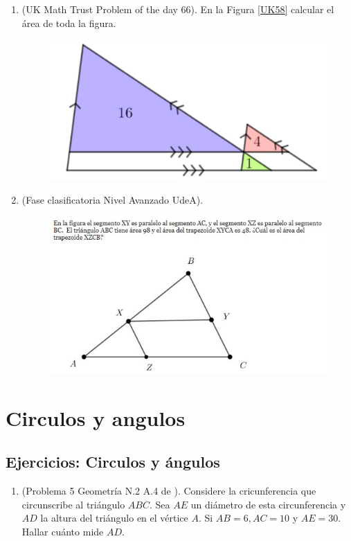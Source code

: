 \begin{enumerate}
	\item (UK Math Trust Problem of the day 66). En la Figura \ref{UK58} calcular el área de toda la figura.
	
	\begin{figure}[H]
		\centering
		\includegraphics[width=0.5\linewidth]{Geometria/imgs/UKMathTrust_PrblemOfTheDay_66}
		\label{UK66}
	\end{figure}

\item (Fase clasificatoria Nivel Avanzado UdeA). 
		\begin{figure}[H]
			\centering
			\includegraphics[width=0.95\linewidth]{Geometria/imgs/udeaproblemasemejanza1}
		\end{figure}
\end{enumerate}
\newpage


\chapter{Circulos y angulos}
\newpage


\begin{center}
	\vspace{-1cm}
	\section{ Ejercicios: Circulos y ángulos}
\end{center}

\begin{enumerate}	
	\item (Problema 5  Geometría N.2 A.4 de \cite{POTI}). Considere la cricunferencia que circunscribe al triángulo $ABC$. Sea $AE$ un diámetro de esta circunferencia y $AD$ la altura del triángulo en el vértice $A$. Si $AB=6,AC=10$ y $AE=30$. Hallar cuánto mide $AD$.
\end{enumerate}

\newpage
